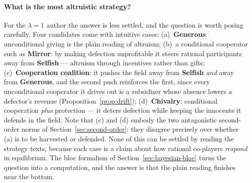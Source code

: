 \paragraph{What is the most altruistic strategy?}
For the $\lambda = 1$ author the answer is less settled, and the
question is worth posing carefully.
Four candidates come with intuitive cases:
(a)~\textbf{Generous}: unconditional giving is the plain reading of
altruism;
(b)~a conditional cooperator such as \textbf{Mirror}: by making
defection unprofitable it steers rational participants away from
\textbf{Selfish} --- altruism through incentives rather than gifts;
(c)~\textbf{Cooperation coalition}: it pushes the field away from
\textbf{Selfish} \emph{and} away from \textbf{Generous}, and the
second push reinforces the first, since every unconditional
cooperator it drives out is a subsidizer whose absence lowers a
defector's revenue (Proposition~\ref{prop:drift});
(d)~\textbf{Chivalry}: conditional cooperation \emph{plus}
protection --- it deters defection while keeping the innocents it
defends in the field.
Note that (c) and (d) embody the two antagonistic second-order norms
of Section~\ref{sec:second-order}: they disagree precisely over
whether (a) is to be harvested or defended.
None of this can be settled by reading the strategy texts, because
each case is a claim about how rational co-players \emph{respond} in
equilibrium.
The bloc formalism of Section~\ref{sec:bayesian-bloc} turns the
question into a computation, and the answer is that the plain
reading finishes near the bottom.

